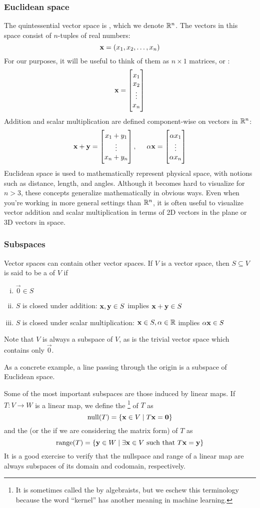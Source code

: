 \subsubsection{Euclidean space}
The quintessential vector space is , which we denote $\mathbb{R}^n$.
The vectors in this space consist of $n$-tuples of real numbers:
\[\mathbf{x} = (x_1, x_2, \dots, x_n)\]
For our purposes, it will be useful to think of them as $n \times 1$ matrices, or :
\[\mathbf{x} = \begin{bmatrix}x_1 \\ x_2 \\ \vdots \\ x_n\end{bmatrix}\]
Addition and scalar multiplication are defined component-wise on vectors in $\mathbb{R}^n$:
\[\mathbf{x} + \mathbf{y} = \begin{bmatrix}x_1 + y_1 \\ \vdots \\ x_n + y_n\end{bmatrix}, \hspace{0.5cm} \alpha\mathbf{x} = \begin{bmatrix}\alpha x_1 \\ \vdots \\ \alpha x_n\end{bmatrix}\]
Euclidean space is used to mathematically represent physical space, with notions such as distance, length, and angles.
Although it becomes hard to visualize for $n > 3$, these concepts generalize mathematically in obvious ways.
Even when you're working in more general settings than $\mathbb{R}^n$, it is often useful to visualize vector addition and scalar multiplication in terms of 2D vectors in the plane or 3D vectors in space.

\subsubsection{Subspaces}
Vector spaces can contain other vector spaces.
If $V$ is a vector space, then $S \subseteq V$ is said to be a  of $V$ if
\begin{enumerate}[(i)]
\item $\vec{0} \in S$
\item $S$ is closed under addition: $\mathbf{x}, \mathbf{y} \in S$ implies $\mathbf{x}+\mathbf{y} \in S$
\item $S$ is closed under scalar multiplication: $\mathbf{x} \in S, \alpha \in \mathbb{R}$ implies $\alpha\mathbf{x} \in S$
\end{enumerate}
Note that $V$ is always a subspace of $V$, as is the trivial vector space which contains only $\vec{0}$.

As a concrete example, a line passing through the origin is a subspace of Euclidean space.

Some of the most important subspaces are those induced by linear maps.
If $T : V \to W$ is a linear map, we define the \footnote{
	It is sometimes called the  by algebraists, but we eschew this terminology because the word ``kernel'' has another meaning in machine learning.
} of $T$ as
\[\operatorname*{null}(T) = \{\mathbf{x} \in V \mid T\mathbf{x} = \mathbf{0}\}\]
and the  (or the  if we are considering the matrix form) of $T$ as
\[\operatorname*{range}(T) = \{\mathbf{y} \in W \mid \text{$\exists \mathbf{x} \in V$ such that $T\mathbf{x} = \mathbf{y}$}\}\]
It is a good exercise to verify that the nullspace and range of a linear map are always subspaces of its domain and codomain, respectively.

